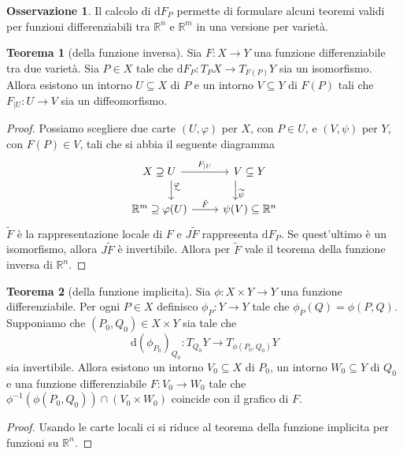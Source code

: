 \documentclass[a4paper,11pt]{article}
\theoremstyle{definition}
\newtheorem{osservazione}{Osservazione}[section]
\theoremstyle{theorem}
\newtheorem{teorema}{Teorema}[section]
\begin{document}
\begin{osservazione}
	Il calcolo di $\mathrm{d}F_P$ permette di formulare alcuni teoremi validi per funzioni differenziabili tra $\mathbb{R}^n$ e $\mathbb{R}^m$ in una versione per varietà.
\end{osservazione}
\begin{teorema}[della funzione inversa]
	Sia $F\colon X\to Y$ una funzione differenziabile tra due varietà. Sia $P\in X$ tale che $\mathrm{d}F_P\colon T_PX\to T_{F(P)}Y$ sia un isomorfismo. Allora esistono un intorno $U\subseteq X$ di $P$ e un intorno $V\subseteq Y$ di $F(P)$ tali che $F_{|U}\colon U\to V$ sia un diffeomorfismo.
\end{teorema}
\begin{proof}
	Possiamo scegliere due carte $(U,\varphi)$ per $X$, con $P\in U$, e $(V,\psi)$ per $Y$, con $F(P)\in V$, tali che si abbia il seguente diagramma
	\[\begin{tikzcd}
	X\supseteq U\arrow[r, "F_{|U}"]\arrow[d, "\sim", "\varphi" near start, shift left=2.5ex]&V\subseteq Y\arrow[d, "\psi" near end, "\sim", shift right=3ex]\\
	\mathbb{R}^m\supseteq\varphi(U)\arrow[r, "\tilde F"]&\psi(V)\subseteq\mathbb{R}^n
	\end{tikzcd}\]
	$\tilde{F}$ è la rappresentazione locale di $F$ e $J\tilde F$ rappresenta $\mathrm{d}F_P$. Se quest'ultimo è un isomorfismo, allora $J\tilde{F}$ è invertibile. Allora per $\tilde F$ vale il teorema della funzione inversa di $\mathbb{R}^n$.
\end{proof}
\begin{teorema}[della funzione implicita]
	Sia $\phi\colon X\times Y\to Y$ una funzione differenziabile. Per ogni $P\in X$ definisco $\phi_P\colon Y\to Y$ tale che $\phi_P(Q)=\phi(P,Q)$. Supponiamo che $(P_0,Q_0)\in X\times Y$ sia tale che \[\mathrm{d}(\phi_{P_0})_{Q_0}\colon T_{Q_0}Y\to T_{\phi(P_0,Q_0)}Y\]
	sia invertibile. Allora esistono un intorno $V_0\subseteq X$ di $P_0$, un intorno $W_0\subseteq Y$ di $Q_0$ e una funzione differenziabile $F\colon V_0\to W_0$ tale che $\phi^{-1}(\phi(P_0,Q_0))\cap(V_0\times W_0)$ coincide con il grafico di $F$.
\end{teorema}
\begin{proof}
	Usando le carte locali ci si riduce al teorema della funzione implicita per funzioni su $\mathbb{R}^n$.
\end{proof}
\newpage
\end{document}
